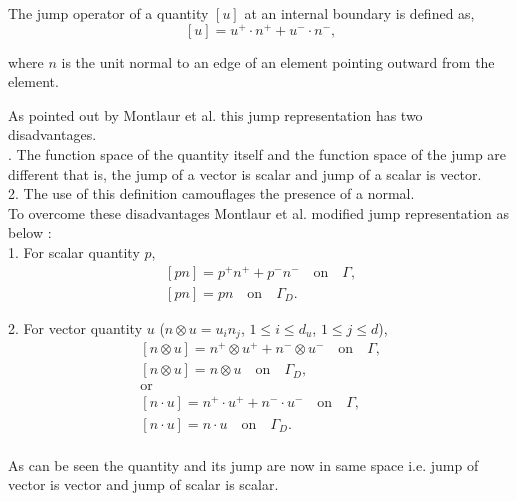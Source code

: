 \documentclass[a4paper,oneside,openright,spanish,english]{book}
\begin{document}
The jump operator of a quantity $[u]$ at an internal boundary is defined as,
\begin{equation}\label{jump operator}
[u]=u^+ \cdot n^+ + u^- \cdot n^- \textrm{,}
\end{equation}

where $n$ is the unit normal to an edge of an element pointing outward from the element.

As pointed out by Montlaur et al. \cite{Montlaur2} this jump representation has two disadvantages.\\
. The function space of the quantity itself and the function space of the jump are different that is, the jump of a vector is scalar and jump of a scalar is vector.\\
2. The use of this definition camouflages the presence of a normal.\\

To overcome these disadvantages Montlaur et al. \cite{Montlaur2} modified jump representation as below :\\

1.  For scalar quantity $p$,
\begin{equation}
\begin{split}
[pn] = p^+ n^+ + p^- n^- \quad \textrm{on} \quad \Gamma \textrm{,}\\
[pn] = p n \quad \textrm{on} \quad \Gamma_D \textrm{.}
\end{split}
\end{equation}

2. For vector quantity $u$ ($n \otimes u = u_i n_j$, $1 \leq i \leq d_u$, $1 \leq j \leq d$),
\begin{equation}
\begin{split}
[n \otimes u] = n^+ \otimes u^+ + n^- \otimes u^- \quad \textrm{on} \quad \Gamma \textrm{,}\\
[n \otimes u] = n \otimes u \quad \textrm{on} \quad \Gamma_D \textrm{,}\\
 \textrm{or} \\
[n \cdot u] = n^+ \cdot u^+ + n^- \cdot u^- \quad \textrm{on} \quad \Gamma \textrm{,}\\
[n \cdot u] = n \cdot u \quad \textrm{on} \quad \Gamma_D \textrm{.}\\
\end{split}
\end{equation}

As can be seen the quantity and its jump are now in same space i.e. jump of vector is vector and jump of scalar is scalar.
\end{document}
